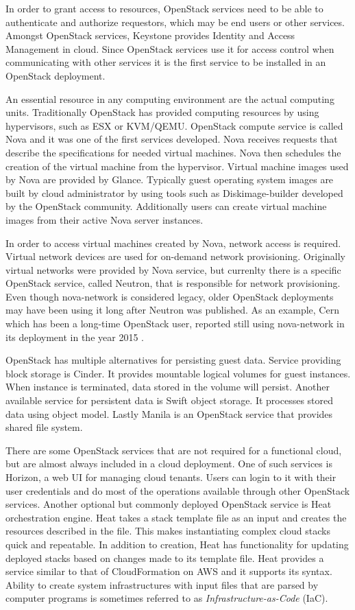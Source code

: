 In order to grant access to resources, OpenStack services need to be able to
authenticate and authorize requestors, which may be end users or other
services. Amongst OpenStack services, Keystone provides Identity and Access
Management in cloud. Since OpenStack services use it for access control when
communicating with other services it is the first service to be installed in
an OpenStack deployment.

An essential resource in any computing environment are the actual computing
units. Traditionally OpenStack has provided computing resources by using
hypervisors, such as ESX or KVM/QEMU. OpenStack compute service is called Nova
and it was one of the first services developed. Nova receives requests that
describe the specifications for needed virtual machines. Nova then schedules
the creation of the virtual machine from the hypervisor. Virtual machine images
used by Nova are provided by Glance. Typically guest operating system images
are built by cloud administrator by using tools such as Diskimage-builder 
developed by the OpenStack community. Additionally users can create virtual
machine images from their active Nova server instances.

In order to access virtual machines created by Nova, network access is
required. Virtual network devices are used for on-demand network provisioning.
Originally virtual networks were provided by Nova service, but currenlty there
is a specific OpenStack service, called Neutron, that is responsible for
network provisioning. Even though nova-network is considered legacy, older
OpenStack deployments may have been using it long after Neutron was published.
As an example, Cern which has been a long-time OpenStack user, reported still
using nova-network in its deployment in the year 2015 \cite{bell2015scaling}.

OpenStack has multiple alternatives for persisting guest data. Service
providing block storage is Cinder. It provides mountable logical volumes for
guest instances. When instance is terminated, data stored in the volume will
persist. Another available service for persistent data is Swift object storage.
It processes stored data using object model. Lastly Manila is an OpenStack
service that provides shared file system.

There are some OpenStack services that are not required for a functional cloud,
but are almost always included in a cloud deployment. One of such services is
Horizon, a web UI for managing cloud tenants. Users can login to it with their
user credentials and do most of the operations available through other
OpenStack services. Another optional but commonly deployed OpenStack service is
Heat orchestration engine. Heat takes a stack template file as an input and
creates the resources described in the file. This makes instantiating complex
cloud stacks quick and repeatable. In addition to creation, Heat has
functionality for updating deployed stacks based on changes made to its
template file. Heat provides a service similar to that of CloudFormation on AWS
and it supports its syntax. Ability to create system infrastructures with input
files that are parsed by computer programs is sometimes referred to as
\textit{Infrastructure-as-Code} (IaC).

